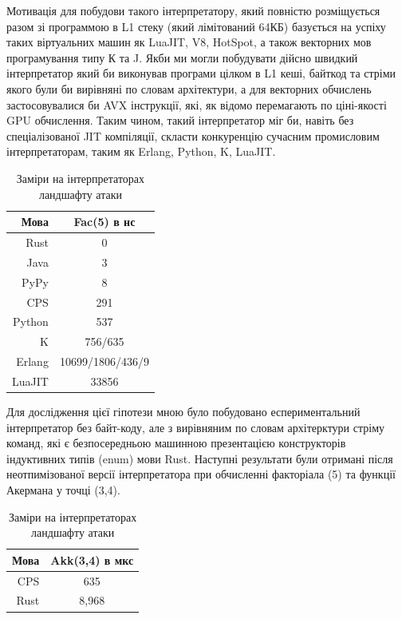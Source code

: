 \documentclass{article}
\begin{document}
Мотивація для побудови такого інтерпретатору, який повністю розміщується
разом зі программою в L1 стеку (який лімітований 64КБ) базується на успіху
таких віртуальних машин як LuaJIT, V8, HotSpot, а також векторних мов
програмування типу К та J. Якби ми могли побудувати дійсно швидкий інтерпретатор
який би виконував програми цілком в L1 кеші, байткод та стріми якого були би
вирівняні по словам архітектури, а для векторних обчислень застосовувалися би AVX інструкції,
які, як відомо перемагають по ціні-якості GPU обчислення. Таким чином, такий
інтерпретатор міг би, навіть без спеціалізованої JIT компіляції, скласти
конкуренцію сучасним промисловим інтерпретаторам, таким як Erlang, Python, K, LuaJIT.

\begin{table}
 \caption{Заміри на інтерпретаторах ландшафту атаки}
  \begin{tabular}{rc}
    \hline
    \textbf{Мова} & \textbf{Fac(5) в нс} \\
    \hline
    Rust    & 0 \\
    Java    & 3 \\
    PyPy    & 8 \\
    \hline
    CPS     & 291 \\
    \hline
    Python  & 537 \\
    K       & 756/635 \\
    \hline
    Erlang  & 10699/1806/436/9 \\
    \hline
    LuaJIT  & 33856 \\
    \hline
  \end{tabular}
\end{table}

Для дослідження цієї гіпотези мною було побудовано еспериментальний інтерпретатор
без байт-коду, але з вирівняним по словам архітерктури стріму команд, які є
безпосередньою машинною презентацією конструкторів індуктивних типів (enum) мови Rust.
Наступні результати були отримані після неотпимізованої версії інтерпретатора
при обчисленні факторіала (5) та функції Акермана у точці (3,4).

\begin{table}
 \caption{Заміри на інтерпретаторах ландшафту атаки}
  \begin{tabular}{rc}
    \hline
    \textbf{Мова} & \textbf{Akk(3,4) в мкс} \\
    \hline
CPS & 635 \\
    \hline
Rust  & 8,968 \\
    \hline
  \end{tabular}
\end{table}
\end{document}
